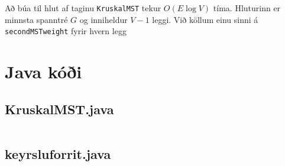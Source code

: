 \documentclass[a4paper,oneside]{article}
\begin{document}
Að búa til hlut af taginu \texttt{KruskalMST} tekur $O(E \log V)$ tíma. Hluturinn er minnsta spanntré $G$ og inniheldur $V-1$ leggi. Við köllum einu sinni á \texttt{secondMSTweight} fyrir hvern legg

\pagebreak
\section{Java kóði}
\subsection{KruskalMST.java}
\inputminted[]{java}{KruskalMST.java}

\subsection{keyrsluforrit.java}
\inputminted[]{java}{keyrsluforrit.java}
\end{document}

